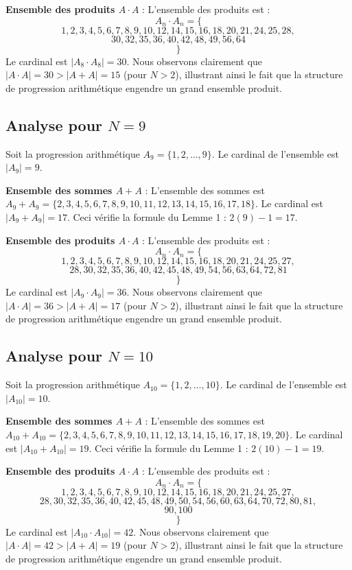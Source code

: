 \documentclass[11pt,a4paper]{article}
\begin{document}
\textbf{Ensemble des produits $A \cdot A$} :
L'ensemble des produits est :
$$ A_{{{n}}} \cdot A_{{{n}}} = \{ $$$$ 1, 2, 3, 4, 5, 6, 7, 8, 9, 10, 12, 14, 15, 16, 18, 20, 21, 24, 25, 28, $$$$ 30, 32, 35, 36, 40, 42, 48, 49, 56, 64 $$$$ \} $$
Le cardinal est $|A_{8} \cdot A_{8}| = 30$.
Nous observons clairement que $|A \cdot A| = 30 > |A+A| = 15$ (pour $N > 2$), illustrant ainsi le fait que la structure de progression arithmétique engendre un grand ensemble produit.
\newpage

\subsection{Analyse pour $N = 9$}
Soit la progression arithmétique $A_{9} = \{1, 2, \dots, 9\} $. Le cardinal de l'ensemble est $|A_{9}| = 9$.

\textbf{Ensemble des sommes $A+A$} :
L'ensemble des sommes est $A_{9} + A_{9} = \{2, 3, 4, 5, 6, 7, 8, 9, 10, 11, 12, 13, 14, 15, 16, 17, 18\} $. Le cardinal est $|A_{9} + A_{9}| = 17$. Ceci vérifie la formule du Lemme 1 : $2(9) - 1 = 17$.

\textbf{Ensemble des produits $A \cdot A$} :
L'ensemble des produits est :
$$ A_{{{n}}} \cdot A_{{{n}}} = \{ $$$$ 1, 2, 3, 4, 5, 6, 7, 8, 9, 10, 12, 14, 15, 16, 18, 20, 21, 24, 25, 27, $$$$ 28, 30, 32, 35, 36, 40, 42, 45, 48, 49, 54, 56, 63, 64, 72, 81 $$$$ \} $$
Le cardinal est $|A_{9} \cdot A_{9}| = 36$.
Nous observons clairement que $|A \cdot A| = 36 > |A+A| = 17$ (pour $N > 2$), illustrant ainsi le fait que la structure de progression arithmétique engendre un grand ensemble produit.
\newpage

\subsection{Analyse pour $N = 10$}
Soit la progression arithmétique $A_{10} = \{1, 2, \dots, 10\} $. Le cardinal de l'ensemble est $|A_{10}| = 10$.

\textbf{Ensemble des sommes $A+A$} :
L'ensemble des sommes est $A_{10} + A_{10} = \{2, 3, 4, 5, 6, 7, 8, 9, 10, 11, 12, 13, 14, 15, 16, 17, 18, 19, 20\} $. Le cardinal est $|A_{10} + A_{10}| = 19$. Ceci vérifie la formule du Lemme 1 : $2(10) - 1 = 19$.

\textbf{Ensemble des produits $A \cdot A$} :
L'ensemble des produits est :
$$ A_{{{n}}} \cdot A_{{{n}}} = \{ $$$$ 1, 2, 3, 4, 5, 6, 7, 8, 9, 10, 12, 14, 15, 16, 18, 20, 21, 24, 25, 27, $$$$ 28, 30, 32, 35, 36, 40, 42, 45, 48, 49, 50, 54, 56, 60, 63, 64, 70, 72, 80, 81, $$$$ 90, 100 $$$$ \} $$
Le cardinal est $|A_{10} \cdot A_{10}| = 42$.
Nous observons clairement que $|A \cdot A| = 42 > |A+A| = 19$ (pour $N > 2$), illustrant ainsi le fait que la structure de progression arithmétique engendre un grand ensemble produit.
\newpage
\end{document}
